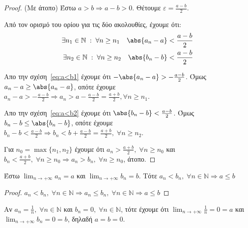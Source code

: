 \documentclass[main.tex]{subfiles}
\begin{document}
\begin{proof}(Με άτοπο)
    Έστω $ a>b \Rightarrow a-b>0 $. Θέτουμε $ \varepsilon = 
    \frac{a-b}{2} $.

    Από τον ορισμό του ορίου για τις δύο ακολουθίες, έχουμε ότι:
    \begin{align}
        \exists n_{1} \in \mathbb{N} \; : \; \forall n \geq n_{1} 
        \quad \abs{a_{n}-a} < \frac{a-b}{2} \label{eq:a<b1} \\
        \exists n_{2} \in \mathbb{N} \; : \; \forall n \geq n_{2} 
        \quad \abs{b_{n}-b} < \frac{a-b}{2} \label{eq:a<b2} \\
    \end{align}

    Απο την σχέση~\eqref{eq:a<b1} έχουμε ότι $ - \abs{a_{n}-a} > - 
    \frac{a-b}{2} $. Όμως $ a_{n}- a \geq \abs{a_{n}-a} $, 
    οπότε έχουμε $ a_{n}- a > - \frac{a-b}{2} \Rightarrow a_{n} > a -
    \frac{a-b}{2} = \frac{a+b}{2}, \forall n \geq n_{1} $.

    Απο την σχέση~\eqref{eq:a<b2} έχουμε ότι $  \abs{b_{n}-b} <  
    \frac{a-b}{2} $. Όμως $ b_{n}- b \leq \abs{b_{n}-b} $, 
    οπότε έχουμε $ b_{n}- b <  \frac{a-b}{2} \Rightarrow b_{n} <  b +
    \frac{a-b}{2} = \frac{a+b}{2}, \; \forall n \geq n_{2}  $.

    Για $ n_{0} = \max \{ n_{1}, n_{2} \} $ έχουμε ότι $ a_{n} > 
    \frac{a+b}{2}, \; \forall n \geq n_{0}$
    και $ b_{n} < \frac{a+b}{2}, \; \forall n \geq n_{0} \Rightarrow 
    a_{n} > b_{n}, \; \forall n \geq n_{0} $, άτοπο.
\end{proof}


\begin{prop}
    Έστω $ \lim_{n \to +\infty} a_{n} = a $ και $ \lim_{n \to +\infty} 
    b_{n} = b $. Τότε
    $
    a_{n} < b_{n}, \; \forall n \in \mathbb{N} \Rightarrow a \leq b
    $ 
\end{prop}

\begin{proof}
    $ a_{n}< b_{n}, \; \forall n \in \mathbb{N} \Rightarrow a_{n} \leq 
    b_{n}, \; \forall n \in \mathbb{N} \Rightarrow a \leq b $
\end{proof}

\begin{rem}
\item {}
    Αν $ a_{n}= \frac{1}{n}, \; \forall n \in \mathbb{N} $ 
    και $ b_{n}=0, \; \forall n \in \mathbb{N} $, τότε έχουμε ότι 
    $ \lim_{n \to +\infty} \frac{1}{n} = 0 = a $ και $ \lim_{n \to
    +\infty} b_{n} = 0 = b $, δηλαδή $ a=b=0  $.
\end{rem}
\end{document}

